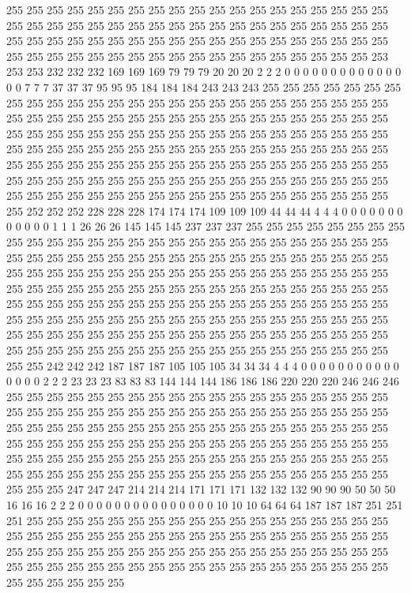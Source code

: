 255 255 255 255 255 255 255 255 255 255 255 255 255 255 255 255 255 255 255 255 255 255 255 255 255 255 255 255 255 255 255 255 255 255 255 255 255 255 255 255 255 255 255 255 255 255 255 255 255 255 255 255 255 255 255 255 255 255 255 255 255 255 255 255 255 255 255 255 255 255 255 255 255 255 255 253 253 253 232 232 232 169 169 169 79 79 79 20 20 20 2 2 2 0 0 0 0 0 0 0 0 0 0 0 0 0 0 0 7 7 7 37 37 37 95 95 95 184 184 184 243 243 243 255 255 255 255 255 
255 255 255 255 255 255 255 255 255 255 255 255 255 255 255 255 255 255 255 255 255 255 255 255 255 255 255 255 255 255 255 255 255 255 255 255 255 255 255 255 255 255 255 255 255 255 255 255 255 255 255 255 255 255 255 255 255 255 255 255 255 255 255 255 255 255 255 255 255 255 255 255 255 255 255 255 255 255 255 255 255 255 255 255 255 255 255 255 255 255 255 255 255 255 255 255 255 255 255 255 255 255 255 255 255 255 255 255 255 255 255 255 255 255 255 255 255 255 255 255 255 255 255 255 255 255 255 255 
255 255 255 255 255 255 255 255 252 252 252 228 228 228 174 174 174 109 109 109 44 44 44 4 4 4 0 0 0 0 0 0 0 0 0 0 0 0 1 1 1 26 26 26 145 145 145 237 237 237 255 255 255 255 255 255 255 255 255 255 255 255 255 255 255 255 255 255 255 255 255 255 255 255 255 255 255 255 255 255 255 255 255 255 255 255 255 255 255 255 255 255 255 255 255 255 255 255 255 255 255 255 255 255 255 255 255 255 255 255 255 255 255 255 255 255 255 255 255 255 255 255 255 255 255 255 255 255 
255 255 255 255 255 255 255 255 255 255 255 255 255 255 255 255 255 255 255 255 255 255 255 255 255 255 255 255 255 255 255 255 255 255 255 255 255 255 255 255 255 255 255 255 255 255 255 255 255 255 255 255 255 255 255 255 255 255 255 255 255 255 255 255 255 255 255 255 255 255 255 255 255 255 255 255 255 255 255 255 255 255 255 255 242 242 242 187 187 187 105 105 105 34 34 34 4 4 4 0 0 0 0 0 0 0 0 0 0 0 0 0 0 0 2 2 2 23 23 23 83 83 83 144 144 144 186 186 
186 220 220 220 246 246 246 255 255 255 255 255 255 255 255 255 255 255 255 255 255 255 255 255 255 255 255 255 255 255 255 255 255 255 255 255 255 255 255 255 255 255 255 255 255 255 255 255 255 255 255 255 255 255 255 255 255 255 255 255 255 255 255 255 255 255 255 255 255 255 255 255 255 255 255 255 255 255 255 255 255 255 255 255 255 255 255 255 255 255 255 255 255 255 255 255 255 255 255 255 255 255 255 255 255 255 255 255 255 255 255 255 255 255 255 255 255 255 255 255 255 255 255 255 247 247 247 214 
214 214 171 171 171 132 132 132 90 90 90 50 50 50 16 16 16 2 2 2 0 0 0 0 0 0 0 0 0 0 0 0 0 0 0 10 10 10 64 64 64 187 187 187 251 251 251 255 255 255 255 255 255 255 255 255 255 255 255 255 255 255 255 255 255 255 255 255 255 255 255 255 255 255 255 255 255 255 255 255 255 255 255 255 255 255 255 255 255 255 255 255 255 255 255 255 255 255 255 255 255 255 255 255 255 255 255 255 255 255 255 255 255 255 255 255 255 255 255 255 255 255 255 255 255 255 255 255 
